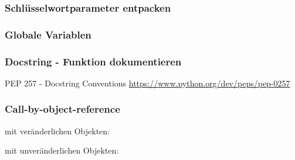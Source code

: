 \subsubsection{Schlüsselwortparameter entpacken}


\subsubsection{Globale Variablen}


\subsubsection{Docstring - Funktion dokumentieren}
PEP 257 - Docstring Conventions \url{https://www.python.org/dev/peps/pep-0257}


\subsubsection{Call-by-object-reference}
mit veränderlichen Objekten:

mit unveränderlichen Objekten:
